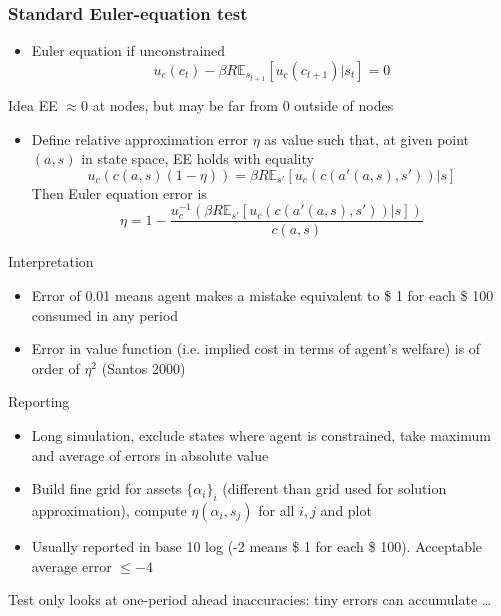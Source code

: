\documentclass{beamer}
\begin{document}
\begin{frame}
  \frametitle{Standard Euler-equation test}
  \begin{itemize}
    \item   Euler equation if unconstrained
      \begin{equation}\tag{EE}
        u_c(c_t) - \beta R \mathbb{E}_{s_{t+1}}[u_c(c_{t+1})|s_t] = 0
      \end{equation}
    \end{itemize}
    \begin{block}{Idea}
      EE $\approx 0$ at nodes, but may be far from 0 outside of nodes
    \end{block}
    \begin{itemize}
      \item   Define relative approximation error $\eta$ as value such that, at given point $(a,s)$ in state space, EE holds with equality
        \begin{equation*}
          u_c(c(a,s)(1-\eta)) = \beta R \mathbb{E}_{s'}[u_c(c(a'(a,s),s'))|s]
        \end{equation*}
        Then Euler equation error is
        \begin{equation*}
          \eta = 1-\frac{u_c^{-1}\left(\beta R \mathbb{E}_{s'}[u_c(c(a'(a,s),s'))|s]\right)}{c(a,s)}
        \end{equation*}
  \end{itemize}
\end{frame}

\begin{frame}
  \begin{block}{Interpretation}
  \begin{itemize}
    \item Error of 0.01 means agent makes a mistake equivalent to \$ 1 for each \$ 100 consumed in any period
    \item Error in value function (i.e. implied cost in terms of agent's welfare) is of order of $\eta^2$ (Santos 2000)
  \end{itemize}
  \end{block}

  \begin{block}{Reporting}
    \begin{itemize}
      \item Long simulation, exclude states where agent is constrained, take maximum and average of errors in absolute value
      \item Build fine grid for assets $\{\alpha_i\}_i$ (different than grid used for solution approximation), compute $\eta(\alpha_i,s_j)$ for all $i, j$ and plot
      \item Usually reported in base 10 log (-2 means \$ 1 for each \$ 100). Acceptable average error $\leq -4$
    \end{itemize}
  \end{block}
  \medskip
  Test only looks at one-period ahead inaccuracies: tiny errors can accumulate \ldots
\end{frame}
\end{document}
